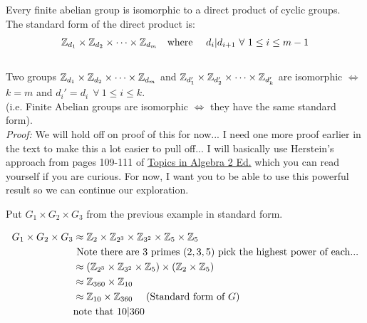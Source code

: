 \begin{theorem}
Every finite abelian group is isomorphic to a direct product of cyclic groups. \steezybreak\\
The standard form of the direct product is:
\begin{align}
    {\mathbb{ Z}}_{d_1}\times {\mathbb{ Z}}_{d_2}\times\cdots \times {\mathbb{ Z}}_{d_m} \ \ \text{ where }\ \ \ d_i|d_{i+1} \ \forall \ 1\leq i \leq m-1 \nonumber
\end{align} \steezybreak\\
Two groups ${\mathbb{ Z}}_{d_1}\times {\mathbb{ Z}}_{d_2}\times \cdots \times {\mathbb{ Z}}_{d_m}$ and ${\mathbb{ Z}}_{d_1'}\times {\mathbb{ Z}}_{d_2'}\times \cdots \times {\mathbb{ Z}}_{d_k'}$ are isomorphic $\iff$ $k=m$ and $d_i'=d_i \ \ \forall \ 1\leq i\leq k$. \steezybreak\\
(i.e. Finite Abelian groups are isomorphic $\iff$ they have the same standard form). \steezybreak\\

\textit{Proof:} We will hold off on proof of this for now... I need one more proof earlier in the text to make this a lot easier to pull off... I will basically use Herstein's approach from pages 109-111 of \href{https://marinazahara22.files.wordpress.com/2013/10/i-n-herstein-topics-in-algebra-2nd-edition-1975-wiley-international-editions-john-wiley-and-sons-wie-1975.pdf}{Topics in Algebra 2 Ed.} which you can read yourself if you are curious. For now, I want you to be able to use this powerful result so we can continue our exploration.
\end{theorem}
\newpage
\begin{example}
Put $G_1\times G_2\times G_3$ from the previous example in standard form.

\begin{align}
    G_1\times G_2\times G_3 &\approx \Z_2\times \Z_{2^3}\times \Z_{3^2}\times \Z_{5}\times \Z_5 \nonumber \\
    & \text{ Note there are 3 primes }(2,3,5)\text{ pick the highest power of each...} \nonumber \\
    &\approx (\Z_{2^3}\times \Z_{3^2}\times \Z_5)\times (\Z_2\times \Z_5) \nonumber \\
    &\approx \Z_{360}\times \Z_{10} \nonumber \\
    &\approx \Z_{10}\times \Z_{360} \nonumber \ \ \ \ \text{(Standard form of }G ) \\
    &\nonumber \text{note that }10|360
\end{align}
\end{example}

